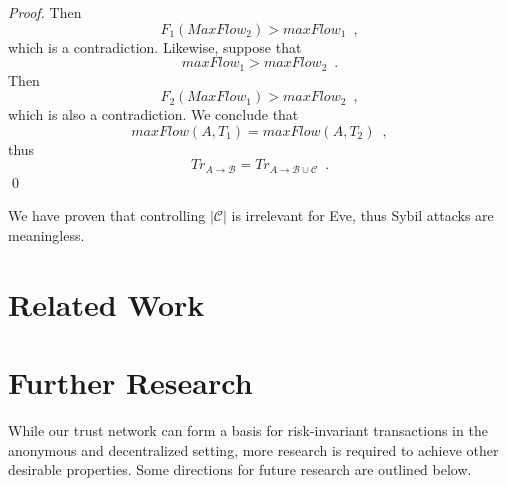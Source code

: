 \documentclass[11pt]{llncs}
\begin{document}
\begin{proof}
       Then
       \begin{equation}
          F_1(MaxFlow_2) > maxFlow_1 \enspace,
       \end{equation}
       which is a contradiction. Likewise, suppose that
       \begin{equation}
          maxFlow_1 > maxFlow_2 \enspace.
       \end{equation}
       Then
       \begin{equation}
          F_2(MaxFlow_1) > maxFlow_2 \enspace,
       \end{equation}
       which is also a contradiction. We conclude that
       \begin{equation}
          maxFlow(A, T_1) = maxFlow(A, T_2) \enspace,
       \end{equation}
       thus
       \begin{equation}
          Tr_{A \rightarrow \mathcal{B}} = Tr_{A \rightarrow \mathcal{B} \cup \mathcal{C}} \enspace.
       \end{equation}
       \qed
    \end{proof}
    We have proven that controlling $|\mathcal{C}|$ is irrelevant for Eve, thus Sybil attacks are meaningless.

  \section{Related Work}

  \section{Further Research}
     While our trust network can form a basis for risk-invariant transactions in the anonymous and decentralized setting,
     more research is required to achieve other desirable properties. Some directions for future research are outlined below.
\end{document}
